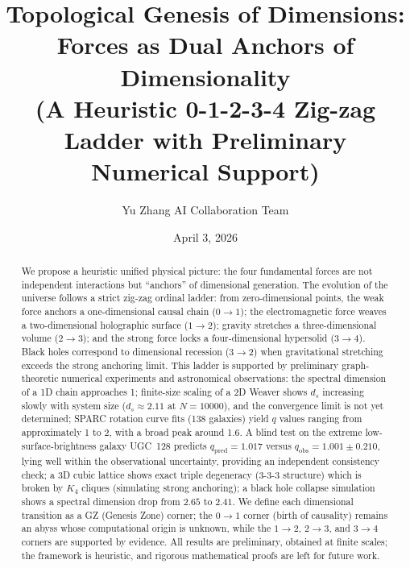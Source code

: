 \documentclass[12pt,a4paper]{article}
\title{Topological Genesis of Dimensions: Forces as Dual Anchors of Dimensionality\\
\large (A Heuristic 0-1-2-3-4 Zig-zag Ladder with Preliminary Numerical Support)}
\author{Yu Zhang \quad AI Collaboration Team}
\date{April 3, 2026}
\begin{document}
\maketitle

\begin{abstract}
We propose a heuristic unified physical picture: the four fundamental forces are not independent interactions but ``anchors'' of dimensional generation. The evolution of the universe follows a strict zig-zag ordinal ladder: from zero-dimensional points, the weak force anchors a one-dimensional causal chain ($0\to1$); the electromagnetic force weaves a two-dimensional holographic surface ($1\to2$); gravity stretches a three-dimensional volume ($2\to3$); and the strong force locks a four-dimensional hypersolid ($3\to4$). Black holes correspond to dimensional recession ($3\to2$) when gravitational stretching exceeds the strong anchoring limit. This ladder is supported by preliminary graph-theoretic numerical experiments and astronomical observations: the spectral dimension of a 1D chain approaches 1; finite-size scaling of a 2D Weaver shows $d_s$ increasing slowly with system size ($d_s\approx2.11$ at $N=10000$), and the convergence limit is not yet determined; SPARC rotation curve fits (138 galaxies) yield $q$ values ranging from approximately 1 to 2, with a broad peak around 1.6. A blind test on the extreme low-surface-brightness galaxy UGC~128 predicts $q_{\text{pred}}=1.017$ versus $q_{\text{obs}}=1.001\pm0.210$, lying well within the observational uncertainty, providing an independent consistency check; a 3D cubic lattice shows exact triple degeneracy ($3$-$3$-$3$ structure) which is broken by $K_4$ cliques (simulating strong anchoring); a black hole collapse simulation shows a spectral dimension drop from $2.65$ to $2.41$. We define each dimensional transition as a GZ (Genesis Zone) corner; the $0\to1$ corner (birth of causality) remains an abyss whose computational origin is unknown, while the $1\to2$, $2\to3$, and $3\to4$ corners are supported by evidence. All results are preliminary, obtained at finite scales; the framework is heuristic, and rigorous mathematical proofs are left for future work.
\end{abstract}
\end{document}
